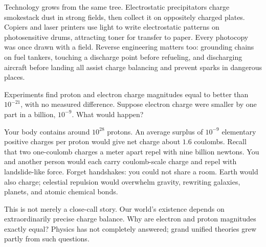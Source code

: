 \begin{mainline}
Technology grows from the same tree. Electrostatic precipitators charge smokestack dust in strong fields, then collect it on oppositely charged plates. Copiers and laser printers use light to write electrostatic patterns on photosensitive drums, attracting toner for transfer to paper. Every photocopy was once drawn with a field. Reverse engineering matters too: grounding chains on fuel tankers, touching a discharge point before refueling, and discharging aircraft before landing all assist charge balancing and prevent sparks in dangerous places.
\end{mainline}


\begin{thought}
Experiments find proton and electron charge magnitudes equal to better than \(10^{-21}\), with no measured difference. Suppose electron charge were smaller by one part in a billion, \(10^{-9}\). What would happen?

Your body contains around \(10^{28}\) protons. An average surplus of \(10^{-9}\) elementary positive charges per proton would give net charge about \(1.6\) coulombs. Recall that two one-coulomb charges a meter apart repel with nine billion newtons. You and another person would each carry coulomb-scale charge and repel with landslide-like force. Forget handshakes: you could not share a room. Earth would also charge; celestial repulsion would overwhelm gravity, rewriting galaxies, planets, and atomic chemical bonds.

This is not merely a close-call story. Our world's existence depends on extraordinarily precise charge balance. Why are electron and proton magnitudes exactly equal? Physics has not completely answered; grand unified theories grew partly from such questions.
\end{thought}

